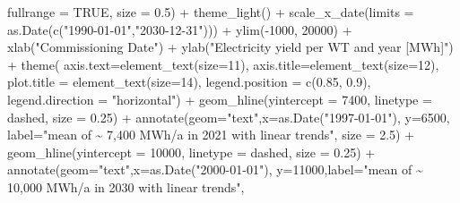 \documentclass[a4paper,11pt]{article}
\newenvironment{Shaded}{\begin{snugshade}}{\end{snugshade}}
\newcommand{\AttributeTok}[1]{\textcolor[rgb]{0.77,0.63,0.00}{#1}}
\newcommand{\ConstantTok}[1]{\textcolor[rgb]{0.00,0.00,0.00}{#1}}
\newcommand{\DecValTok}[1]{\textcolor[rgb]{0.00,0.00,0.81}{#1}}
\newcommand{\FloatTok}[1]{\textcolor[rgb]{0.00,0.00,0.81}{#1}}
\newcommand{\FunctionTok}[1]{\textcolor[rgb]{0.00,0.00,0.00}{#1}}
\newcommand{\NormalTok}[1]{#1}
\newcommand{\SpecialCharTok}[1]{\textcolor[rgb]{0.00,0.00,0.00}{#1}}
\newcommand{\StringTok}[1]{\textcolor[rgb]{0.31,0.60,0.02}{#1}}
\begin{document}
\begin{Shaded}
\begin{Highlighting}[]
              \AttributeTok{fullrange =} \ConstantTok{TRUE}\NormalTok{, }\AttributeTok{size =} \FloatTok{0.5}\NormalTok{)  }\SpecialCharTok{+}
  \FunctionTok{theme\_light}\NormalTok{() }\SpecialCharTok{+}
  \FunctionTok{scale\_x\_date}\NormalTok{(}\AttributeTok{limits =} \FunctionTok{as.Date}\NormalTok{(}\FunctionTok{c}\NormalTok{(}\StringTok{"1990{-}01{-}01"}\NormalTok{,}\StringTok{"2030{-}12{-}31"}\NormalTok{))) }\SpecialCharTok{+}
  \FunctionTok{ylim}\NormalTok{(}\SpecialCharTok{{-}}\DecValTok{1000}\NormalTok{, }\DecValTok{20000}\NormalTok{) }\SpecialCharTok{+}
  \FunctionTok{xlab}\NormalTok{(}\StringTok{"Commissioning Date"}\NormalTok{) }\SpecialCharTok{+}
  \FunctionTok{ylab}\NormalTok{(}\StringTok{"Electricity yield per WT and year [MWh]"}\NormalTok{) }\SpecialCharTok{+}
  \FunctionTok{theme}\NormalTok{( }\AttributeTok{axis.text=}\FunctionTok{element\_text}\NormalTok{(}\AttributeTok{size=}\DecValTok{11}\NormalTok{),}
         \AttributeTok{axis.title=}\FunctionTok{element\_text}\NormalTok{(}\AttributeTok{size=}\DecValTok{12}\NormalTok{),}
         \AttributeTok{plot.title =} \FunctionTok{element\_text}\NormalTok{(}\AttributeTok{size=}\DecValTok{14}\NormalTok{),}
         \AttributeTok{legend.position =} \FunctionTok{c}\NormalTok{(}\FloatTok{0.85}\NormalTok{, }\FloatTok{0.9}\NormalTok{),}
         \AttributeTok{legend.direction =} \StringTok{"horizontal"}\NormalTok{) }\SpecialCharTok{+}
  \FunctionTok{geom\_hline}\NormalTok{(}\AttributeTok{yintercept =} \DecValTok{7400}\NormalTok{, }\AttributeTok{linetype =} \StringTok{\textquotesingle{}dashed\textquotesingle{}}\NormalTok{, }\AttributeTok{size =} \FloatTok{0.25}\NormalTok{) }\SpecialCharTok{+}
  \FunctionTok{annotate}\NormalTok{(}\AttributeTok{geom=}\StringTok{"text"}\NormalTok{,}\AttributeTok{x=}\FunctionTok{as.Date}\NormalTok{(}\StringTok{"1997{-}01{-}01"}\NormalTok{), }
           \AttributeTok{y=}\DecValTok{6500}\NormalTok{, }\AttributeTok{label=}\StringTok{"mean of \textasciitilde{} 7,400 MWh/a in 2021 with linear trends"}\NormalTok{, }
           \AttributeTok{size =} \FloatTok{2.5}\NormalTok{) }\SpecialCharTok{+}
  \FunctionTok{geom\_hline}\NormalTok{(}\AttributeTok{yintercept =} \DecValTok{10000}\NormalTok{, }\AttributeTok{linetype =} \StringTok{\textquotesingle{}dashed\textquotesingle{}}\NormalTok{, }\AttributeTok{size =} \FloatTok{0.25}\NormalTok{) }\SpecialCharTok{+}
  \FunctionTok{annotate}\NormalTok{(}\AttributeTok{geom=}\StringTok{"text"}\NormalTok{,}\AttributeTok{x=}\FunctionTok{as.Date}\NormalTok{(}\StringTok{"2000{-}01{-}01"}\NormalTok{),}
           \AttributeTok{y=}\DecValTok{11000}\NormalTok{,}\AttributeTok{label=}\StringTok{"mean of \textasciitilde{} 10,000 MWh/a in 2030 with linear trends"}\NormalTok{, }

\end{Highlighting}
\end{Shaded}
\end{document}
